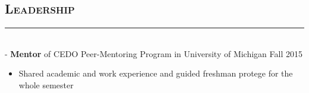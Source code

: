 \documentclass[11pt]{res}
\newcommand{\style}[1]{\color{Blue}\large\textsc{#1}}
\begin{document}
\begin{resume}

   

\section{\style{Leadership}}
  \vspace{-10pt}
\rule{18cm}{0.5mm}\\
 -\sectionwidth \resumewidth
 \textbf{Mentor} of CEDO Peer-Mentoring Program in University of Michigan \hfill{Fall 2015}  \hspace{-0.58in}\vspace{-0mm}
   \begin{itemize}[leftmargin=-0.1in]
  \item Shared academic and work experience and guided freshman protege for the whole semester
   \end{itemize}\vspace{-15pt}
   

\end{resume}
\end{document}
